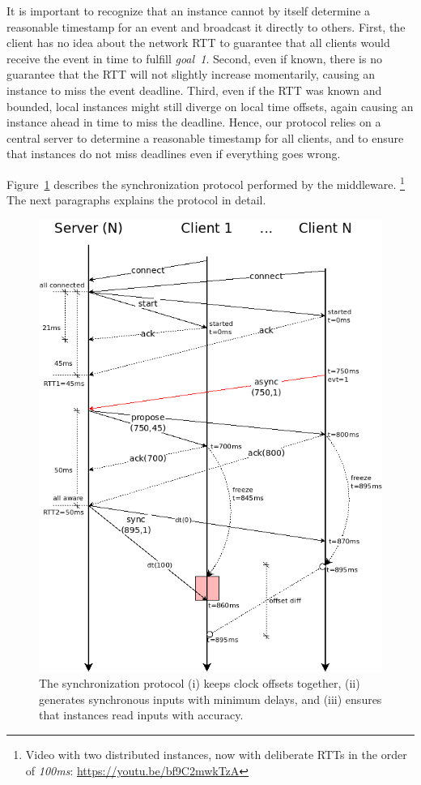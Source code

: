 \documentclass[sigplan,screen]{acmart}
\begin{document}
It is important to recognize that an instance cannot by itself determine a
reasonable timestamp for an event and broadcast it directly to others.
%
First, the client has no idea about the network RTT to guarantee that all
clients would receive the event in time to fulfill \emph{goal~1}.
%
Second, even if known, there is no guarantee that the RTT will not slightly
increase momentarily, causing an instance to miss the event deadline.
%
Third, even if the RTT was known and bounded, local instances might still
diverge on local time offsets, again causing an instance ahead in time to miss
the deadline.
%
Hence, our protocol relies on a central server to determine a reasonable
timestamp for all clients, and to ensure that instances do not miss deadlines
even if everything goes wrong.

Figure~\ref{fig.protocol} describes the synchronization protocol performed by
the middleware.%
\footnote {
    Video with two distributed instances, now with deliberate RTTs in the order
    of \emph{100ms}: \url{https://youtu.be/bf9C2mwkTzA}
}
The next paragraphs explains the protocol in detail.

\begin{figure}[t]
  \centering
  \includegraphics[width=\linewidth]{protocol}
  \caption{
    \label{fig.protocol}
    The synchronization protocol
        (i) keeps clock offsets together,
        (ii) generates synchronous inputs with minimum delays, and
        (iii) ensures that instances read inputs with accuracy.
  }
\end{figure}
\end{document}
